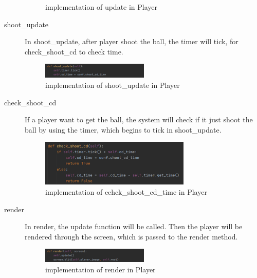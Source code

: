 \documentclass[14pt]{extarticle}
\begin{document}
\begin{description}
\begin{figure}[H]
\begin{center}
			\caption{implementation of update in Player}
		\end{center}
	\end{figure}
	\item[shoot\_update]
	In shoot\_update, after player shoot the ball, the timer will tick, for check\_shoot\_cd to check time.
	\begin{figure}[H]
		\begin{center}
			\includegraphics[width=0.5\textwidth]{Player_shoot_update}
			\caption{implementation of shoot\_update in Player}
		\end{center}
	\end{figure}
	\item[check\_shoot\_cd]
	If a player want to get the ball, the system will check if it just shoot the ball by using the timer, which begins to tick in shoot\_update.
	\begin{figure}[H]
		\begin{center}
			\includegraphics[width=0.7\textwidth]{Player_check_shoot_cd}
			\caption{implementation of cehck\_shoot\_cd\_time in Player}
		\end{center}
	\end{figure}
	\item[render]
	In render, the update function will be called. Then the player will be rendered through the screen, which is passed to the render method.
	\begin{figure}[H]
		\begin{center}
			\includegraphics[width=0.5\textwidth]{Player_render}
			\caption{implementation of render in Player}
		\end{center}
	\end{figure}
\end{description}
\end{document}
